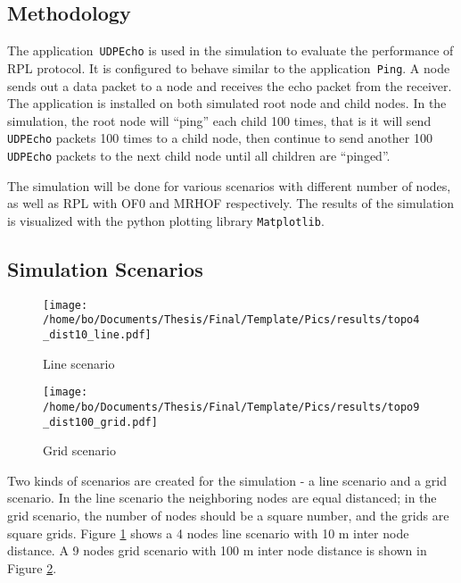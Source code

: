 \subsection{Methodology}
\label{Sim:Method}
The application~\texttt{UDPEcho} is used in the simulation to evaluate the performance of RPL protocol. It is configured to behave similar to the application~\texttt{Ping}. A node sends out a data packet to a node and receives the echo packet from the receiver. The application is installed on both simulated root node and child nodes. In the simulation, the root node will ``ping'' each child 100 times, that is it will send \texttt{UDPEcho} packets 100 times to a child node, then continue to send another 100 \texttt{UDPEcho} packets to the next child node until all children are  ``pinged''.     
\newline

The simulation will be done for various scenarios with different number of nodes, as well as RPL with OF0 and MRHOF respectively. The results of the simulation is visualized with the python plotting library \texttt{Matplotlib}.

\subsection{Simulation Scenarios}
\label{Sim:Scenarios}
\begin{figure}[!ht]
 	\centering
    \leavevmode
      \texttt{[image: /home/bo/Documents/Thesis/Final/Template/Pics/results/topo4\_dist10\_line.pdf]}
    \caption{Line scenario}
    \label{fig:scenario_line}
\end{figure}

\begin{figure}[!ht]	
  	\centering
    \leavevmode
      \texttt{[image: /home/bo/Documents/Thesis/Final/Template/Pics/results/topo9\_dist100\_grid.pdf]}
    \caption{Grid scenario}
    \label{fig:scenario_grid}
\end{figure}

Two kinds of scenarios are created for the simulation - a line scenario and a grid scenario. In the line scenario the neighboring nodes are equal distanced; in the grid scenario, the number of nodes should be a square number, and the grids are square grids. Figure \ref{fig:scenario_line} shows a 4 nodes line scenario with 10 m inter node distance. A 9 nodes grid scenario with 100 m inter node distance is shown in Figure \ref{fig:scenario_grid}.
\newline

